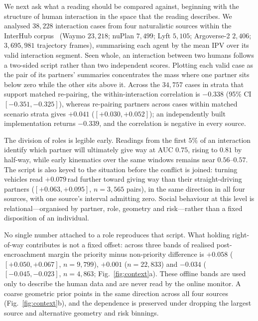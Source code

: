 \documentclass[12pt,a4paper]{article}
\begin{document}
We next ask what a reading should be compared against, beginning with the structure of human
interaction in the space that the reading describes. We analysed $38{,}228$ interaction cases from
four naturalistic sources within the InterHub corpus~\cite{jiang2025interhub} (Waymo $23{,}218$;
nuPlan $7{,}499$; Lyft $5{,}105$; Argoverse-2 $2{,}406$; $3{,}695{,}981$ trajectory frames),
summarising each agent by the mean IPV over its valid interaction segment. Seen whole, an interaction
between two humans follows a two-sided script rather than two independent scores. Plotting each valid
case as the pair of its partners' summaries concentrates the mass where one partner sits below zero
while the other sits above it. Across the $34{,}757$ cases in strata that
support matched re-pairing, the within-interaction correlation is $-0.338$ (95\% CI
$[-0.351,-0.325]$), whereas re-pairing partners across cases within matched scenario strata gives
$+0.041$ ($[+0.030,+0.052]$); an independently built implementation returns $-0.339$, and the
correlation is negative in every source.

The division of roles is legible early. Readings from the first $5\%$ of an interaction identify
which partner will ultimately give way at AUC $0.75$, rising to $0.81$ by half-way, while early
kinematics over the same windows remains near $0.56$--$0.57$. The script is
also keyed to the situation before the conflict is joined: turning vehicles read $+0.079$\,rad
further toward giving way than their straight-driving partners ($[+0.063,+0.095]$,
$n=3{,}565$ pairs), in the same direction in all four sources, with one source's interval admitting
zero. Social behaviour at this level is relational---organised by partner,
role, geometry and risk---rather than a fixed disposition of an individual.

No single number attached to a role reproduces that script. What holding right-of-way contributes is
not a fixed offset: across three bands of realised post-encroachment margin the priority minus
non-priority difference is $+0.058$ ($[+0.050,+0.067]$, $n=9{,}799$), $+0.001$
($n=22{,}833$) and $-0.034$ ($[-0.045,-0.023]$, $n=4{,}863$; Fig.~\ref{fig:context}a).
These offline bands are used only to describe the human data and are never read by the online monitor.
A coarse geometric prior points in the same direction across all four sources
(Fig.~\ref{fig:context}b), and the dependence is preserved
under dropping the largest source and alternative geometry and risk binnings.
\end{document}
